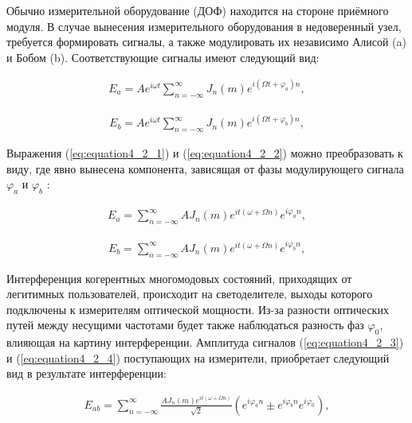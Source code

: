 Обычно измерительной оборудование (ДОФ) находится на стороне приёмного модуля. В случае вынесения измерительного оборудования в недоверенный узел, требуется формировать сигналы, а также модулировать их независимо Алисой (a) и Бобом (b). Соответствующие сигналы имеют следующий вид:

\begin{equation}
	\begin{aligned}
	\label{eq:equation4_2_1}
		E_a = Ae^{i \omega t} \sum_{n=-\infty}^\infty J_{n}(m) e^{i (\Omega t+ \varphi_a) n},
	\end{aligned}
\end{equation}

\begin{equation}
	\begin{aligned}
	\label{eq:equation4_2_2}
		E_b = Ae^{i \omega t} \sum_{n=-\infty}^\infty J_{n}(m) e^{i (\Omega t+ \varphi_b) n},
	\end{aligned}
\end{equation}

Выражения (\ref{eq:equation4_2_1}) и (\ref{eq:equation4_2_2}) можно преобразовать к виду, где явно вынесена компонента, зависящая от фазы модулирующего сигнала $\varphi_a$ и $\varphi_b$ :

\begin{equation}
	\begin{aligned}
	\label{eq:equation4_2_3}
		E_a = \sum_{n=-\infty}^\infty A J_{n}(m) e^{i t (\omega + \Omega n)} e^{i \varphi_a n},
	\end{aligned}
\end{equation}

\begin{equation}
	\begin{aligned}
	\label{eq:equation4_2_4}
		E_b = \sum_{n=-\infty}^\infty A J_{n}(m) e^{i t (\omega + \Omega n)} e^{i \varphi_b n},
	\end{aligned}
\end{equation}


Интерференция когерентных многомодовых состояний, приходящих от легитимных пользователей, происходит на светоделителе, выходы которого подключены к измерителям оптической мощности. Из-за разности оптических путей между несущими частотами будет также наблюдаться разность фаз $\varphi_0$, влияющая на картину интерференции. Амплитуда сигналов (\ref{eq:equation4_2_3}) и (\ref{eq:equation4_2_4}) поступающих на измерители, приобретает следующий вид в результате интерференции:

\begin{equation}
	\begin{aligned}
	\label{eq:equation4_2_5}
		E_{ab} = \sum_{n=-\infty}^\infty \frac{A J_{n}(m) e^{i t (\omega + \Omega n)}}{\sqrt{2}} (e^{i \varphi_a n} \pm e^{i \varphi_b n}e^{i \varphi_0}),
	\end{aligned}
\end{equation}

